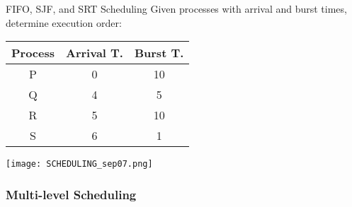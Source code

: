\begin{example2}{FIFO{,} SJF{,} and SRT Scheduling}
    Given processes with arrival and burst times, determine execution order:

    \begin{minipage}{0.35\linewidth}    
    \begin{tabular}{|c|c|c|}
        \hline
        Process & Arrival T. & Burst T. \\
        \hline
        P & 0 & 10 \\
        Q & 4 & 5 \\
        R & 5 & 10 \\
        S & 6 & 1 \\
        \hline
    \end{tabular}
    \end{minipage}
    \begin{minipage}{0.65\linewidth}    
    \texttt{[image: SCHEDULING\_sep07.png]}
    \end{minipage}
\end{example2}

\subsubsection{Multi-level Scheduling}

